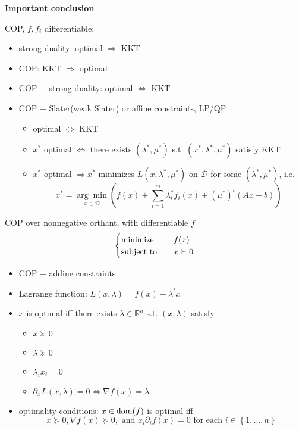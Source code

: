 \begin{remark}
    \textbf{Important conclusion}

    COP, $f, f_i$ differentiable:
    \begin{itemize}
        \item strong duality: optimal $\Longrightarrow$ KKT
        \item COP: KKT $\Longrightarrow$ optimal
        \item COP + strong duality: optimal $\Longleftrightarrow$ KKT
        \item COP + Slater(weak Slater) or affine constraints, LP/QP\begin{itemize}
            \item optimal $\Longleftrightarrow$ KKT
            \item $x^*$ optimal $\Longleftrightarrow$ there exists $(\lambda^*, \mu^*)$ s.t. $(x^*, \lambda^*, \mu^*)$ satisfy KKT
            \item $x^*$ optimal $\Longrightarrow x^*$ minimizes $L(x, \lambda^*, \mu^*)$ on $\mathcal{D}$ for some $(\lambda^*, \mu^*)$, i.e.\[x^{*}=\underset{x \in \mathcal{D}}{\arg \min }\left(f(x)+\sum_{i=1}^{m} \lambda_{i}^{*} f_{i}(x)+\left(\mu^{*}\right)^{t}(A x-b)\right)\] 
        \end{itemize}
    \end{itemize}
\end{remark}

\begin{remark}
    COP over nonnegative orthant, with differentiable $f$\[\begin{cases}
        \operatorname{minimize} \quad &f(x)\\
        \operatorname{subject\ to} \quad &x \succeq 0
    \end{cases}\]
    \begin{itemize}
        \item COP + addine constraints
        \item Lagrange function: $L(x, \lambda) = f(x) - \lambda^tx$
        \item $x$ is optimal iff there exists $\lambda \in \mathbb{R}^n$ s.t. $(x, \lambda)$ satisfy\begin{itemize}
            \item $x \succeq 0$
            \item $\lambda \succeq 0$
            \item $\lambda_ix_i = 0$
            \item $\partial_xL(x, \lambda) = 0\Longleftrightarrow \nabla f(x) = \lambda$
        \end{itemize}
        \item optimality conditions: $x \in \operatorname{dom}(f)$ is optimal iff\[x \succeq 0, \nabla f(x) \succeq 0, \text{ and } x_i\partial_if(x) = 0 \text{ for each } i \in \left\{1, \dots, n\right\}\]
    \end{itemize}
\end{remark}

